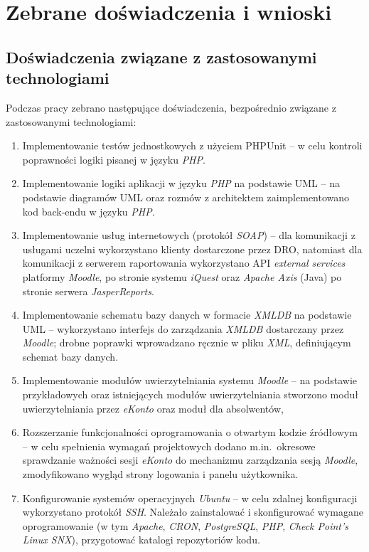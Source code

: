 \chapter{Zebrane doświadczenia i wnioski}
\label{Chapter8}

\section{Doświadczenia związane z zastosowanymi technologiami}
\label{Chapter81}

Podczas pracy zebrano następujące doświadczenia, bezpośrednio związane z zastosowanymi technologiami:

\begin{enumerate}
\item Implementowanie testów jednostkowych z użyciem PHPUnit -- w celu kontroli poprawności logiki pisanej w języku \textit{PHP}.
\item Implementowanie logiki aplikacji w języku \textit{PHP} na podstawie UML -- na podstawie diagramów UML oraz rozmów z architektem zaimplementowano kod back-endu w języku \textit{PHP}.
\item Implementowanie usług internetowych (protokół \textit{SOAP}) -- dla komunikacji z usługami uczelni wykorzystano klienty dostarczone przez DRO, natomiast dla komunikacji z serwerem raportowania wykorzystano API \textit{external services} platformy \textit{Moodle}, po stronie systemu \textit{iQuest} oraz \textit{Apache Axis} (Java) po stronie serwera \textit{JasperReports}.
\item Implementowanie schematu bazy danych w formacie \textit{XMLDB} na podstawie UML -- wykorzystano interfejs do zarządzania \textit{XMLDB} dostarczany przez \textit{Moodle}; drobne poprawki wprowadzano ręcznie w pliku \textit{XML}, definiującym schemat bazy danych.
\item Implementowanie modułów uwierzytelniania systemu \textit{Moodle} -- na podstawie przykładowych oraz istniejących modułów uwierzytelniania stworzono moduł uwierzytelniania przez \textit{eKonto} oraz moduł dla absolwentów,
\item Rozszerzanie funkcjonalności oprogramowania o otwartym kodzie źródłowym -- w celu spełnienia wymagań projektowych dodano m.in.~okresowe sprawdzanie ważności sesji \textit{eKonto} do mechanizmu zarządzania sesją \textit{Moodle}, zmodyfikowano wygląd strony logowania i panelu użytkownika.
\item Konfigurowanie systemów operacyjnych \textit{Ubuntu} -- w celu zdalnej konfiguracji wykorzystano protokół \textit{SSH}. Należało zainstalować i skonfigurować wymagane oprogramowanie (w tym \textit{Apache}, \textit{CRON}, \textit{PostgreSQL}, \textit{PHP}, \textit{Check Point's Linux SNX}), przygotować katalogi repozytoriów kodu.

\end{enumerate}
